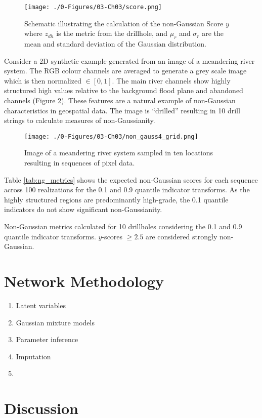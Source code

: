 \begin{figure}[htb!]
    \centering
    \texttt{[image: ./0-Figures/03-Ch03/score.png]}
    \caption{Schematic illustrating the calculation of the non-Gaussian Score $y$ where $z_{dh}$ is the metric from the drillhole, and $\mu_{r}$ and $\sigma_{r}$ are the mean and standard deviation of the Gaussian distribution.}
    \label{fig:score}
\end{figure}

Consider a \gls{2D} synthetic example generated from an image of a meandering river system. The RGB colour channels are averaged to generate a grey scale image which is then normalized $\in [0,1]$. The main river channels show highly structured high values relative to the background flood plane and abandoned channels (Figure \ref{fig:non_gauss4_grid}). These features are a natural example of non-Gaussian characteristics in geospatial data. The image is ``drilled'' resulting in 10 drill strings to calculate measures of non-Gaussianity.

\begin{figure}[htb!]
    \centering
    \texttt{[image: ./0-Figures/03-Ch03/non\_gauss4\_grid.png]}
    \caption{Image of a meandering river system sampled in ten locations resulting in sequences of pixel data.}
    \label{fig:non_gauss4_grid}
\end{figure}

Table \ref{tab:ng_metrics} shows the expected non-Gaussian scores for each sequence across 100 realizations for the 0.1 and 0.9 quantile indicator transforms. As the highly structured regions are predominantly high-grade, the 0.1 quantile indicators do not show significant non-Gaussianity.


\begin{table}[!htb]
    \centering
    \caption{Non-Gaussian metrics calculated for 10 drillholes considering the 0.1 and 0.9 quantile indicator transforms. $y$-scores $\geq 2.5$ are considered strongly non-Gaussian.}
    \resizebox{1\width}{!}{}
    \label{tab:ng_metrics}
\end{table}


\FloatBarrier
\section{Network Methodology}
\label{sec:method}

\begin{enumerate}
    \item Latent variables
    \item Gaussian mixture models
    \item Parameter inference
    \item Imputation
    \item
\end{enumerate}


\FloatBarrier
\section{Discussion}
\label{sec:discuss03}